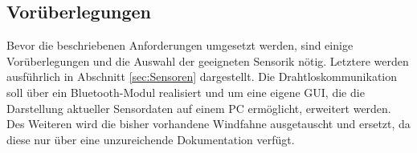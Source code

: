 \subsection{Vorüberlegungen}\label{subsec:Vorueberlegungen}
Bevor die beschriebenen Anforderungen umgesetzt werden, sind einige Vorüberlegungen und die Auswahl der geeigneten Sensorik nötig. Letztere werden ausführlich in Abschnitt \ref{sec:Sensoren} dargestellt. Die Drahtloskommunikation soll über ein Bluetooth-Modul realisiert und um eine eigene GUI, die die Darstellung aktueller Sensordaten auf einem PC ermöglicht, erweitert werden. Des Weiteren wird die bisher vorhandene Windfahne ausgetauscht und ersetzt, da diese nur über eine unzureichende Dokumentation verfügt.
